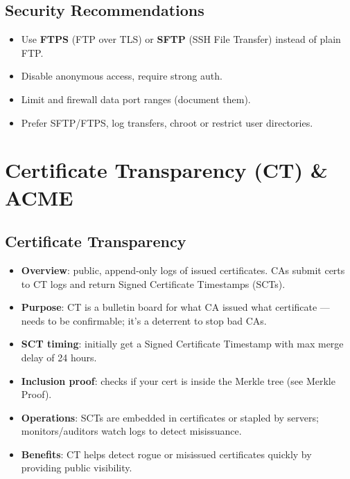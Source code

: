 \documentclass[11pt]{article}
\begin{document}
\subsection{Security Recommendations}
\begin{itemize}
  \item Use \textbf{FTPS} (FTP over TLS) or \textbf{SFTP} (SSH File Transfer) instead of plain FTP.
  
  \item Disable anonymous access, require strong auth.
  
  \item Limit and firewall data port ranges (document them).
  
  \item Prefer SFTP/FTPS, log transfers, chroot or restrict user directories.
\end{itemize}

\section{Certificate Transparency (CT) \& ACME}

\subsection{Certificate Transparency}
\begin{itemize}
  \item \textbf{Overview}: public, append-only logs of issued certificates. CAs submit certs to CT logs and return Signed Certificate Timestamps (SCTs).
  
  \item \textbf{Purpose}: CT is a bulletin board for what CA issued what certificate --- needs to be confirmable; it's a deterrent to stop bad CAs.
  
  \item \textbf{SCT timing}: initially get a Signed Certificate Timestamp with max merge delay of 24 hours.
  
  \item \textbf{Inclusion proof}: checks if your cert is inside the Merkle tree (see Merkle Proof).
  
  \item \textbf{Operations}: SCTs are embedded in certificates or stapled by servers; monitors/auditors watch logs to detect misissuance.
  
  \item \textbf{Benefits}: CT helps detect rogue or misissued certificates quickly by providing public visibility.
\end{itemize}
\end{document}
